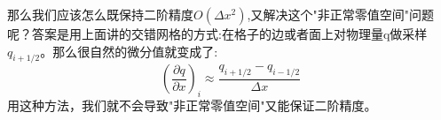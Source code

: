 \documentclass{article}
\begin{document}
\par
那么我们应该怎么既保持二阶精度$O(\Delta x^2)$,又解决这个"非正常零值空间"问题呢？答案是用上面讲的交错网格的方式:在格子的边或者面上对物理量q做采样$q_{i+1/2}$。那么很自然的微分值就变成了:
\begin{equation}
(\frac{\partial{q}}{\partial{x}})_i\approx \frac{q_{i+1/2}-q_{i-1/2}}{\Delta x}
\end{equation}
用这种方法，我们就不会导致"非正常零值空间"又能保证二阶精度。
\end{document}
